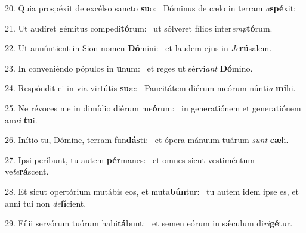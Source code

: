 20. Quia prospéxit de excélso sancto \textbf{su}o: \ast\  Dóminus de cælo in terram \textit{a}\textbf{spé}xit:\

21. Ut audíret gémitus compedi\textbf{tó}rum: \ast\  ut sólveret fílios inter\textit{emp}\textbf{tó}rum.\

22. Ut annúntient in Sion nomen \textbf{Dó}mini: \ast\  et laudem ejus in \textit{Je}\textbf{rú}salem.\

23. In conveniéndo pópulos in \textbf{u}num: \ast\  et reges ut sérvi\textit{ant} \textbf{Dó}mino.\

24. Respóndit ei in via virtútis \textbf{su}æ: \ast\  Paucitátem diérum meórum núnti\textit{a} \textbf{mi}hi.\

25. Ne révoces me in dimídio diérum me\textbf{ó}rum: \ast\  in generatiónem et generatiónem an\textit{ni} \textbf{tu}i.\

26. Inítio tu, Dómine, terram fun\textbf{dás}ti: \ast\  et ópera mánuum tuárum \textit{sunt} \textbf{cæ}li.\

27. Ipsi períbunt, tu autem \textbf{pér}manes: \ast\  et omnes sicut vestiméntum ve\textit{te}\textbf{rá}scent.\

28. Et sicut opertórium mutábis eos, et muta\textbf{bún}tur: \ast\  tu autem idem ipse es, et anni tui non \textit{de}\textbf{fí}cient.\

29. Fílii servórum tuórum habi\textbf{tá}bunt: \ast\  et semen eórum in sǽculum di\textit{ri}\textbf{gé}tur.\

